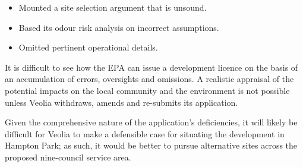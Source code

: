 \documentclass[12pt]{article}
\begin{document}
\begin{itemize}
  \item Mounted a site selection argument that is unsound.
  \item Based its odour risk analysis on incorrect assumptions.
  \item Omitted pertinent operational details.
\end{itemize}

It is difficult to see how the EPA can issue a development licence on the basis of an accumulation of errors, oversights and omissions. A realistic appraisal of the potential impacts on the local community and the environment is not possible unless Veolia withdraws, amends and re-submits its application. 

Given the comprehensive nature of the application's deficiencies, it will likely be difficult for Veolia to make a defensible case for situating the development in Hampton Park; as such, it would be better to pursue alternative sites across the proposed nine-council service area.

\printbibliography
\end{document}
